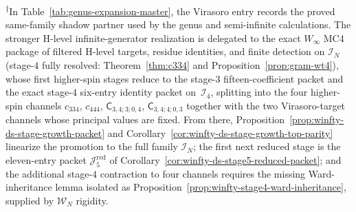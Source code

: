 \noindent\textsuperscript{$\dagger$}In Table~\ref{tab:genus-expansion-master},
the Virasoro entry records the proved same-family shadow partner used by
the genus and semi-infinite calculations. The stronger H-level
infinite-generator realization is delegated to the exact $W_\infty$
MC4 package of filtered H-level targets, residue identities, and finite
detection on $\mathcal{I}_N$
(stage-$4$ fully resolved: Theorem~\ref{thm:c334} and
Proposition~\ref{prop:gram-wt4}),
whose first higher-spin stages reduce to the stage-$3$
fifteen-coefficient packet and the exact stage-$4$ six-entry identity
packet on~$\mathcal{I}_4$, splitting into the four higher-spin channels
$c_{334}$, $c_{444}$,
$\mathsf{C}_{3,4;3;0,4}$, $\mathsf{C}_{3,4;4;0,3}$ together with the
two Virasoro-target channels whose principal values are fixed. From
there, Proposition~\ref{prop:winfty-ds-stage-growth-packet} and
Corollary~\ref{cor:winfty-ds-stage-growth-top-parity} linearize the
promotion to the full family $\mathcal{I}_N$; the first next reduced
stage is the eleven-entry packet
$\mathcal{J}_5^{\mathrm{red}}$ of
Corollary~\ref{cor:winfty-ds-stage5-reduced-packet}; and the additional
stage-$4$ contraction to four channels requires the missing
Ward-inheritance lemma isolated as
Proposition~\ref{prop:winfty-stage4-ward-inheritance}, supplied by
$\mathcal{W}_N$ rigidity.

